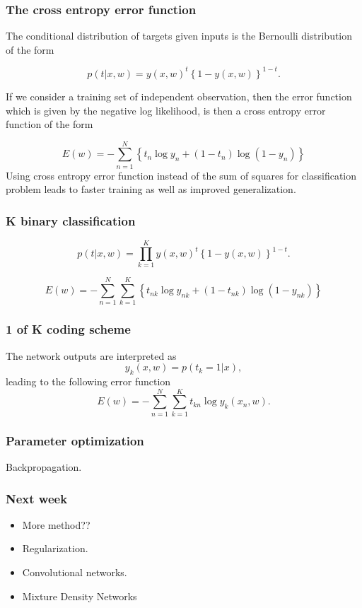 \begin{frame}
  \frametitle{The cross entropy error function}
  The conditional distribution of targets given 
  inputs is the Bernoulli distribution of the form

  \begin{equation}
    p(t|x,w)
    = 
    y(x,w)^t
    \left\{
      1 - y(x,w)
    \right\}^{1-t}.
  \end{equation}

  If we consider a training set of independent observation, 
  then the error function which is given by the negative log 
  likelihood, is then a cross entropy error function of the form 

  \begin{equation}
    E(w)
    =
    - 
    \sum_{n = 1}^N
    \left\{ 
      t_n \log y_n
      +
      (1-t_n) \log(1 - y_n)
    \right\}
  \end{equation}
Using cross entropy error function instead of the sum of squares 
for classification problem leads to faster training as well as improved generalization.
\end{frame}


\begin{frame}
  \frametitle{K binary classification}

  \begin{equation}
    p(t|x,w)
    = 
    \prod_{k=1}^K
    y(x,w)^t
    \left\{
      1 - y(x,w)
    \right\}^{1-t}.
  \end{equation}

  \begin{equation}
    E(w)
    =
    - 
    \sum_{n = 1}^N
    \sum_{k = 1}^K
    \left\{ 
      t_{n k} \log y_{n k}
      +
      (1-t_{n k}) \log(1 - y_{n k})
    \right\}
  \end{equation}

\end{frame}

\begin{frame}
  \frametitle{1 of K coding scheme}
The network outputs are interpreted as
\begin{equation}
  y_k(x,w)
  = 
  p(t_k = 1 | x),
\end{equation}
leading to the following error function
  \begin{equation}
    E(w)
    = 
    - \sum_{n=1}^N
    \sum_{k=1}^K
    t_{k n}
    \log y_k(x_n, w).
  \end{equation}
\end{frame}

\begin{frame}
  \frametitle{Parameter optimization}
  Backpropagation.
\end{frame}

\begin{frame}
  \frametitle{Next week}

  \begin{itemize}
    \item More method??
    \item Regularization.
    \item Convolutional networks.
    \item Mixture Density Networks
  \end{itemize}
  

\end{frame}